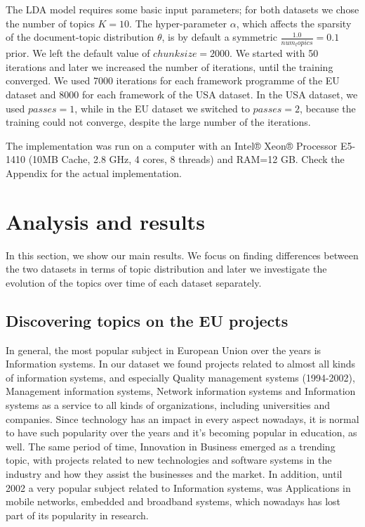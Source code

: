 \documentclass[12pt]{report}
\begin{document}
The LDA model requires some basic input parameters; for both datasets we chose
the number of topics $K=10$. The hyper-parameter $\alpha$, which affects the
sparsity of the document-topic distribution $\theta$, is by default a symmetric
$\frac{1.0}{num_topics} = 0.1$ prior. We left the default value of $chunksize=2000$. We
started with 50 iterations and later we increased the number of iterations,
until the training converged. We used 7000 iterations for each framework
programme of the EU dataset and 8000 for each framework of the USA dataset. In
the USA dataset, we used $passes=1$, while in the EU dataset we switched to
$passes=2$, because the training could not converge, despite the large number of
the iterations.

The implementation was run on a computer with an Intel® Xeon® Processor E5-1410
(10MB Cache, 2.8 GHz, 4 cores, 8 threads) and RAM=12 GB. Check the Appendix for 
the actual implementation.


\section{Analysis and results}
\label{analysis}
In this section, we show our main results. We focus on finding
differences between the two datasets in terms of topic distribution
and later we investigate the evolution of the topics over time of each
dataset separately.

\subsection{Discovering topics on the EU projects}


In general, the most popular subject in European Union over the years
is Information systems. In our dataset we found projects
related to almost all kinds of information systems, and especially
Quality management systems (1994-2002), Management information
systems, Network information systems and Information systems as a
service to all kinds of organizations, including universities and
companies. Since technology has an impact in every aspect nowadays, it
is normal to have such popularity over the years and it's becoming
popular in education, as well. The same period of time, Innovation in
Business emerged as a trending topic, with projects related to new
technologies and software systems in the industry and how they assist
the businesses and the market. In addition, until 2002 a very popular
subject related to Information systems, was Applications in mobile
networks, embedded and broadband systems, which nowadays has lost part
of its popularity in research.
\end{document}
